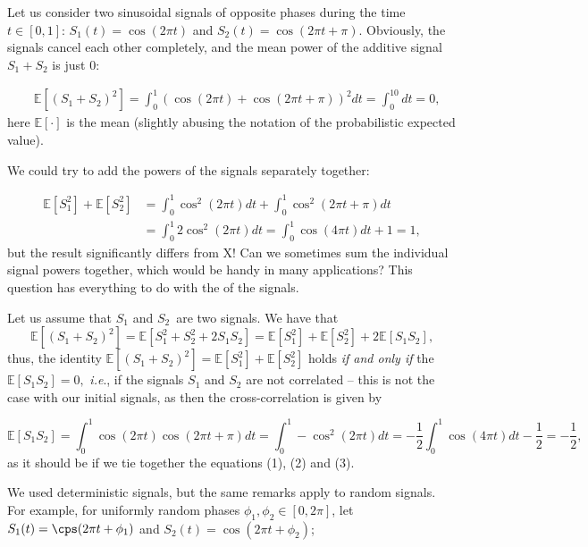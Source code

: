 \documentclass{article}
\begin{document}
Let us consider two sinusoidal signals of opposite phases during the time $t \in [0,1]$: $S_1(t) = \cos(2 \pi t)$ and $S_2(t) = \cos(2 \pi t + \pi)$. Obviously, the signals cancel each other completely, and the mean power of the additive signal $ S_1 + S_2$ is just $0$:

\begin{align}
  &\mathbb{E}[(S_1 + S_2)^2] = \int_0^1 (\cos(2 \pi t) + \cos(2 \pi t + \pi))^2dt = \int_0^10 dt = 0, \tag{1}
\end{align}
here $\mathbb{E}[\cdot]$ is the mean (slightly abusing the notation of the probabilistic expected value).


We could try to add the powers of the signals separately together:

\begin{align}
  \mathbb{E}[S_1^2] + \mathbb{E}[S_2^2] &=   \int_0^1 \cos^2(2 \pi t) dt + \int_0^1 \cos^2(2 \pi  t + \pi) dt \tag{2} \\
  &= \int_0^1 2 \cos^2(2 \pi t)  dt= \int_0^1 \cos(4 \pi t)dt + 1 = 1, \nonumber
\end{align}
but the result significantly differs from X! Can we sometimes sum the individual signal powers together, which would be handy in many applications? This question has everything to do with the  of the signals.

Let us assume that $S_1$ and $S_2$ are two signals. We have that
\begin{equation}
  \mathbb{E}[(S_1 + S_2)^2] = \mathbb{E}[S_1^2 + S_2^2 + 2 S_1 S_2]= \mathbb{E}[S_1^2] + \mathbb{E}[S_2^2] + 2 \mathbb{E}[S_1 S_2], \tag{3}
\end{equation}
thus, the identity $\mathbb{E}[(S_1 + S_2)^2] = \mathbb{E}[S_1^2] + \mathbb{E}[S_2^2] $ holds \textit{if and only if} the  $\mathbb{E}[S_1 S_2] = 0,$ \textit{i.e}., if the signals $S_1$ and $S_2$ are not correlated – this is not the case with our initial signals, as then the cross-correlation is given by

$$
\mathbb{E}[S_1S_2] = \int_0^1 \cos(2 \pi t) \cos(2 \pi t + \pi) dt =\int_0^1 -\cos^2(2 \pi t )dt = - \frac{1}{2}\int_0^1 \cos(4 \pi t)dt - \frac{1}{2} = - \frac{1}{2},
$$
as it should be if we tie together the equations (1), (2) and (3).

We used deterministic signals, but the same remarks apply to random signals. For example, for uniformly random phases $\phi_1,\phi_2 \in [0,2 \pi]$, let $S_1(t) = \cps(2 \pi t + \phi_1)$ and $S_2(t) = \cos(2 \pi t + \phi_2)$;
\end{document}
